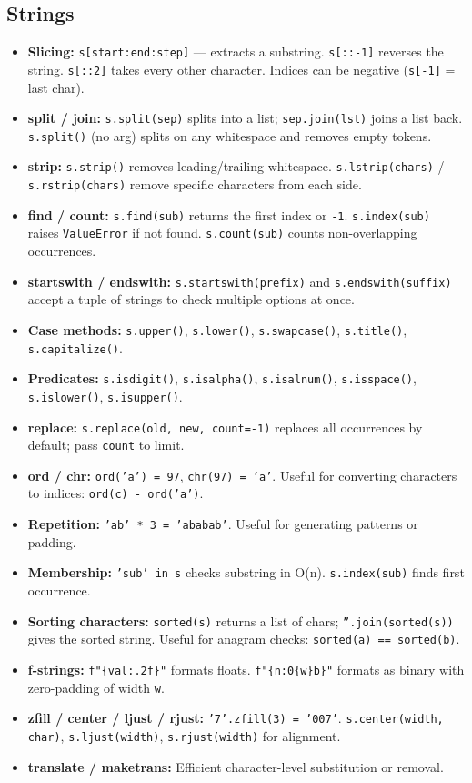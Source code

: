 \subsection{Strings}

\begin{itemize}
    \item \textbf{Slicing: } \texttt{s[start:end:step]} — extracts a substring. \texttt{s[::-1]} reverses the string. \texttt{s[::2]} takes every other character. Indices can be negative (\texttt{s[-1]} = last char).
    \item \textbf{split / join: } \texttt{s.split(sep)} splits into a list; \texttt{sep.join(lst)} joins a list back. \texttt{s.split()} (no arg) splits on any whitespace and removes empty tokens.
    \item \textbf{strip: } \texttt{s.strip()} removes leading/trailing whitespace. \texttt{s.lstrip(chars)} / \texttt{s.rstrip(chars)} remove specific characters from each side.
    \item \textbf{find / count: } \texttt{s.find(sub)} returns the first index or \texttt{-1}. \texttt{s.index(sub)} raises \texttt{ValueError} if not found. \texttt{s.count(sub)} counts non-overlapping occurrences.
    \item \textbf{startswith / endswith: } \texttt{s.startswith(prefix)} and \texttt{s.endswith(suffix)} accept a tuple of strings to check multiple options at once.
    \item \textbf{Case methods: } \texttt{s.upper()}, \texttt{s.lower()}, \texttt{s.swapcase()}, \texttt{s.title()}, \texttt{s.capitalize()}.
    \item \textbf{Predicates: } \texttt{s.isdigit()}, \texttt{s.isalpha()}, \texttt{s.isalnum()}, \texttt{s.isspace()}, \texttt{s.islower()}, \texttt{s.isupper()}.
    \item \textbf{replace: } \texttt{s.replace(old, new, count=-1)} replaces all occurrences by default; pass \texttt{count} to limit.
    \item \textbf{ord / chr: } \texttt{ord('a') = 97}, \texttt{chr(97) = 'a'}. Useful for converting characters to indices: \texttt{ord(c) - ord('a')}.
    \item \textbf{Repetition: } \texttt{'ab' * 3 = 'ababab'}. Useful for generating patterns or padding.
    \item \textbf{Membership: } \texttt{'sub' in s} checks substring in O(n). \texttt{s.index(sub)} finds first occurrence.
    \item \textbf{Sorting characters: } \texttt{sorted(s)} returns a list of chars; \texttt{''.join(sorted(s))} gives the sorted string. Useful for anagram checks: \texttt{sorted(a) == sorted(b)}.
    \item \textbf{f-strings: } \texttt{f"\{val:.2f\}"} formats floats. \texttt{f"\{n:0\{w\}b\}"} formats as binary with zero-padding of width \texttt{w}.
    \item \textbf{zfill / center / ljust / rjust: } \texttt{'7'.zfill(3) = '007'}. \texttt{s.center(width, char)}, \texttt{s.ljust(width)}, \texttt{s.rjust(width)} for alignment.
    \item \textbf{translate / maketrans: } Efficient character-level substitution or removal.
\end{itemize}

